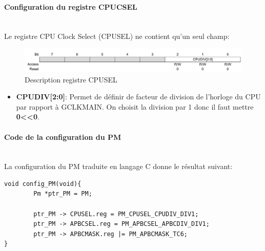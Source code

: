 \documentclass[a4paper]{article}
\begin{document}
	\paragraph{Configuration du registre CPUCSEL} 
	~~\\
	Le registre CPU Clock Select (CPUSEL) ne contient qu'un seul champ:
	\begin{figure}[H]
		\centering
		\includegraphics[width=0.9\linewidth]{CPUSEL.jpg}
		\caption{Description registre CPUSEL}
	\end{figure}
	\begin{itemize}
		\item {\bf CPUDIV[2:0]}: Permet de définir de facteur de division de l'horloge du CPU par rapport à GCLKMAIN. On choisit la division par 1 donc il faut mettre {\bf 0\textless\textless0}.~~\\
	\end{itemize}
	
	\paragraph{Code de la configuration du PM} ~~\\
	La configuration du PM traduite en langage C donne le résultat suivant:
	\begin{lstlisting}[style=CStyle]
void config_PM(void){
	    Pm *ptr_PM = PM;
	
	    ptr_PM -> CPUSEL.reg = PM_CPUSEL_CPUDIV_DIV1;
	    ptr_PM -> APBCSEL.reg = PM_APBCSEL_APBCDIV_DIV1;
	    ptr_PM -> APBCMASK.reg |= PM_APBCMASK_TC6;
}
	\end{lstlisting}
	
\end{document}
